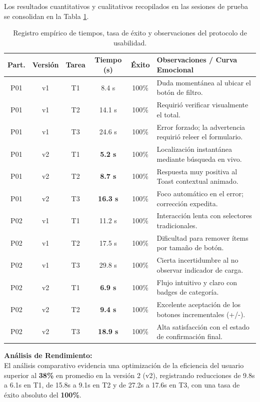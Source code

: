 \documentclass{article}
\begin{document}
Los resultados cuantitativos y cualitativos recopilados en las sesiones de prueba se consolidan en la Tabla \ref{tab:evaluacion_resultados}.

\begin{table}[H]
\centering
\caption{Registro empírico de tiempos, tasa de éxito y observaciones del protocolo de usabilidad.}
\label{tab:evaluacion_resultados}
\vspace{0.2cm}
\begin{tabularx}{\textwidth}{c c c c c X}
\toprule
\textbf{Part.} & \textbf{Versión} & \textbf{Tarea} & \textbf{Tiempo (s)} & \textbf{Éxito} & \textbf{Observaciones / Curva Emocional} \\
\midrule
P01 & v1 & T1 & 8.4 s & 100\% & Duda momentánea al ubicar el botón de filtro. \\
P01 & v1 & T2 & 14.1 s & 100\% & Requirió verificar visualmente el total. \\
P01 & v1 & T3 & 24.6 s & 100\% & Error forzado; la advertencia requirió releer el formulario. \\
\midrule
P01 & v2 & T1 & \textbf{5.2 s} & 100\% & Localización instantánea mediante búsqueda en vivo. \\
P01 & v2 & T2 & \textbf{8.7 s} & 100\% & Respuesta muy positiva al Toast contextual animado. \\
P01 & v2 & T3 & \textbf{16.3 s} & 100\% & Foco automático en el error; corrección expedita. \\
\midrule
P02 & v1 & T1 & 11.2 s & 100\% & Interacción lenta con selectores tradicionales. \\
P02 & v1 & T2 & 17.5 s & 100\% & Dificultad para remover ítems por tamaño de botón. \\
P02 & v1 & T3 & 29.8 s & 100\% & Cierta incertidumbre al no observar indicador de carga. \\
\midrule
P02 & v2 & T1 & \textbf{6.9 s} & 100\% & Flujo intuitivo y claro con badges de categoría. \\
P02 & v2 & T2 & \textbf{9.4 s} & 100\% & Excelente aceptación de los botones incrementales (+/-). \\
P02 & v2 & T3 & \textbf{18.9 s} & 100\% & Alta satisfacción con el estado de confirmación final. \\
\bottomrule
\end{tabularx}
\end{table}

\textbf{Análisis de Rendimiento:} \\
El análisis comparativo evidencia una optimización de la eficiencia del usuario superior al \textbf{38\%} en promedio en la versión 2 (v2), registrando reducciones de 9.8s a 6.1s en T1, de 15.8s a 9.1s en T2 y de 27.2s a 17.6s en T3, con una tasa de éxito absoluto del \textbf{100\%}.
\end{document}
